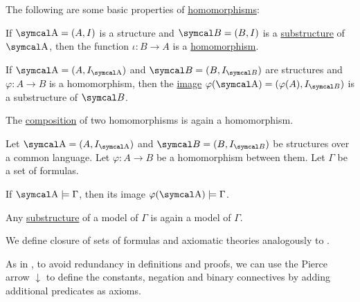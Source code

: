 \begin{proposition}\label{thm:first_order_homomorphism_properties}
  The following are some basic properties of \hyperref[def:first_order_homomorphism]{homomorphisms}:
  \begin{DefEnum}
     If \( \CA = (A, I) \) is a structure and \( \Cal{B} = (B, I) \) is a \hyperref[def:first_order_substructure]{substructure} of \( \CA \), then the function \( \iota: B \to A \) is a \hyperref[def:first_order_homomorphism/projection]{homomorphism}.

     If \( \CA = (A, I_{\CA}) \) and \( \Cal{B} = (B, I_{\Cal{B}}) \) are structures and \( \varphi: A \to B \) is a homomorphism, then the \hyperref[def:function]{image} \( \varphi(\CA) = (\varphi(A), I_{\Cal{B}}) \) is a substructure of \( \Cal{B} \).

     The \hyperref[def:function/composition]{composition} of two homomorphisms is again a homomorphism.
  \end{DefEnum}
\end{proposition}

\begin{proposition}\label{thm:first_order_homomorphism_preserves_models}
  Let \( \CA = (A, I_{\CA}) \) and \( \Cal{B} = (B, I_{\Cal{B}}) \) be structures over a common language. Let \( \varphi: A \to B \) be a homomorphism between them. Let \( \Gamma \) be a set of formulas.

  If \( \CA \models \Gamma \), then its image \( \varphi(\CA) \models \Gamma \).
\end{proposition}

\begin{corollary}\label{thm:substructure_is_model}
  Any \hyperref[def:first_order_substructure]{substructure} of a model of \( \Gamma \) is again a model of \( \Gamma \).
\end{corollary}

\begin{definition}\label{def:first_order_theory}
  We define closure of sets of formulas and axiomatic theories analogously to .
\end{definition}

\begin{remark}\label{rem:minimal_first_order_language}
  As in , to avoid redundancy in definitions and proofs, we can use the Pierce arrow \( \downarrow \) to define the constants, negation and binary connectives by adding additional predicates as axioms.
\end{remark}

